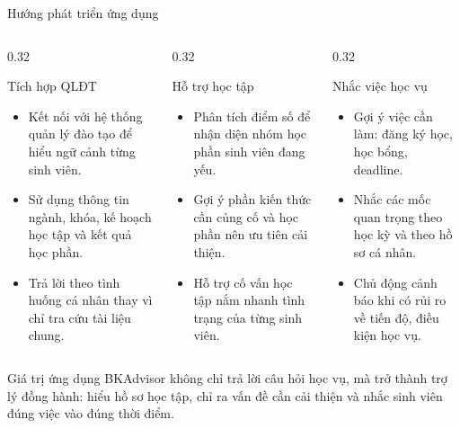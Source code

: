 \documentclass[t, aspectratio=169]{beamer}
\begin{document}
	\begin{frame}{Hướng phát triển ứng dụng}
		\begin{columns}[T,onlytextwidth]
			\begin{column}{0.32\textwidth}
				\begin{block}{Tích hợp QLĐT}
					\scriptsize
					\begin{itemize}
						\setlength{\itemsep}{0.05cm}
						\item Kết nối với hệ thống quản lý đào tạo để hiểu ngữ cảnh từng sinh viên.
						\item Sử dụng thông tin ngành, khóa, kế hoạch học tập và kết quả học phần.
						\item Trả lời theo tình huống cá nhân thay vì chỉ tra cứu tài liệu chung.
					\end{itemize}
				\end{block}
			\end{column}
			\begin{column}{0.32\textwidth}
				\begin{block}{Hỗ trợ học tập}
					\scriptsize
					\begin{itemize}
						\setlength{\itemsep}{0.05cm}
						\item Phân tích điểm số để nhận diện nhóm học phần sinh viên đang yếu.
						\item Gợi ý phần kiến thức cần củng cố và học phần nên ưu tiên cải thiện.
						\item Hỗ trợ cố vấn học tập nắm nhanh tình trạng của từng sinh viên.
					\end{itemize}
				\end{block}
			\end{column}
			\begin{column}{0.32\textwidth}
				\begin{block}{Nhắc việc học vụ}
					\scriptsize
					\begin{itemize}
						\setlength{\itemsep}{0.05cm}
						\item Gợi ý việc cần làm: đăng ký học, học bổng, deadline.
						\item Nhắc các mốc quan trọng theo học kỳ và theo hồ sơ cá nhân.
						\item Chủ động cảnh báo khi có rủi ro về tiến độ, điều kiện học vụ.
					\end{itemize}
				\end{block}
			\end{column}
		\end{columns}

		\vspace{0.18cm}
		\begin{alertblock}{Giá trị ứng dụng}
			\scriptsize BKAdvisor không chỉ trả lời câu hỏi học vụ, mà trở thành trợ lý đồng hành: hiểu hồ sơ học tập, chỉ ra vấn đề cần cải thiện và nhắc sinh viên đúng việc vào đúng thời điểm.
		\end{alertblock}
	\end{frame}

	\hustthankyou
\end{document}
